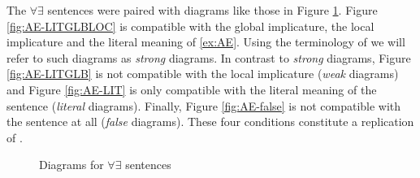 \documentclass[a4paper,10pt]{article}
\begin{document}
The $\forall \exists$ sentences were paired with diagrams like those in Figure \ref{fig:AE}. Figure \ref{fig:AE-LITGLBLOC} is compatible with the global implicature, the local implicature and the literal meaning of \ref{ex:AE}. Using the terminology of  we will refer to such diagrams as {\it strong} diagrams. In contrast to {\it strong} diagrams, Figure \ref{fig:AE-LITGLB} is not compatible with the local implicature ({\it weak} diagrams) and Figure \ref{fig:AE-LIT} is only compatible with the literal meaning of the sentence ({\it literal} diagrams). Finally, Figure \ref{fig:AE-false} is not compatible with the sentence at all ({\it false} diagrams).  These four conditions constitute a replication of .

\begin{figure}[ht]
\centering
{}
\caption[Optional caption for list of figures]{Diagrams for $\forall \exists$ sentences}
\label{fig:AE}
\end{figure}
\end{document}
